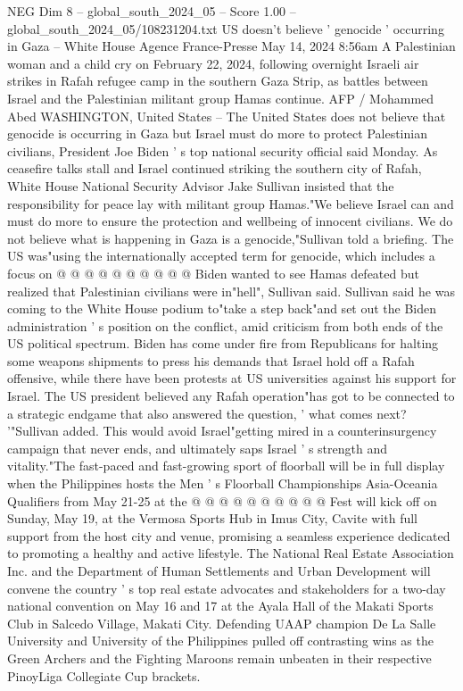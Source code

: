 \begin{textsample}{NEG Dim 8 – global\_south\_2024\_05 – Score 1.00 – global\_south\_2024\_05/108231204.txt}  \label{ex:f8_neg_234}
US doesn't believe ' genocide ' occurring in Gaza -- White House Agence France-Presse May 14, 2024 8:56am A Palestinian woman and a child cry on February 22, 2024, following overnight Israeli air strikes in Rafah refugee camp in the southern Gaza Strip, as battles between Israel and the Palestinian militant group Hamas continue.
AFP / Mohammed Abed WASHINGTON, United States -- The United States does not believe that genocide is occurring in Gaza but Israel must do more to protect Palestinian civilians, President Joe Biden ' s top national security official said Monday.
As ceasefire talks stall and Israel continued striking the southern city of Rafah, White House National Security Advisor Jake Sullivan insisted that the responsibility for peace lay with militant group Hamas."We believe Israel can and must do more to ensure the protection and wellbeing of innocent civilians.
We do not believe what is happening in Gaza is a genocide,"Sullivan told a briefing.
The US was"using the internationally accepted term for genocide, which includes a focus on @ @ @ @ @ @ @ @ @ @ Biden wanted to see Hamas defeated but realized that Palestinian civilians were in"hell", Sullivan said.
Sullivan said he was coming to the White House podium to"take a step back"and set out the Biden administration ' s position on the conflict, amid criticism from both ends of the US political spectrum.
Biden has come under fire from Republicans for halting some weapons shipments to press his demands that Israel hold off a Rafah offensive, while there have been protests at US universities against his support for Israel.
The US president believed any Rafah operation"has got to be connected to a strategic endgame that also answered the question, ' what comes next? '"Sullivan added.
This would avoid Israel"getting mired in a counterinsurgency campaign that never ends, and ultimately saps Israel ' s strength and vitality."The fast-paced and fast-growing sport of floorball will be in full display when the Philippines hosts the Men ' s Floorball Championships Asia-Oceania Qualifiers from May 21-25 at the @ @ @ @ @ @ @ @ @ @ Fest will kick off on Sunday, May 19, at the Vermosa Sports Hub in Imus City, Cavite with full support from the host city and venue, promising a seamless experience dedicated to promoting a healthy and active lifestyle.
The National Real Estate Association Inc. and the Department of Human Settlements and Urban Development will convene the country ' s top real estate advocates and stakeholders for a two-day national convention on May 16 and 17 at the Ayala Hall of the Makati Sports Club in Salcedo Village, Makati City.
Defending UAAP champion De La Salle University and University of the Philippines pulled off contrasting wins as the Green Archers and the Fighting Maroons remain unbeaten in their respective PinoyLiga Collegiate Cup brackets.

\end{textsample}
